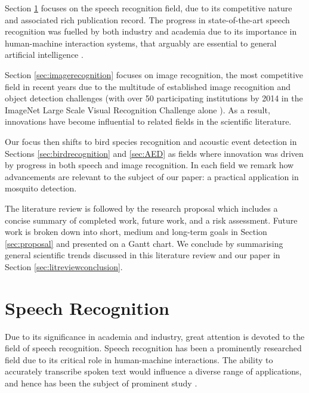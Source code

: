 \documentclass[12pt]{llncs}
\begin{document}
Section \ref{sec:speechrecognition} focuses on the speech recognition field, due to its competitive nature and associated rich publication record. The progress in state-of-the-art speech recognition was fuelled by both industry and academia due to its importance in human-machine interaction systems, that arguably are essential to general artificial intelligence \cite{rabiner1993fundamentals,juang2005automatic}. 

Section \ref{sec:imagerecognition} focuses on image recognition, the most competitive field in recent years due to the multitude of established image recognition and object detection challenges (with over 50 participating institutions by 2014 in the ImageNet Large Scale Visual Recognition Challenge alone \cite{russakovsky2014imagenet}). As a result, innovations have become influential to related fields in the scientific literature.

Our focus then shifts to bird species recognition and acoustic event detection in Sections \ref{sec:birdrecognition} and \ref{sec:AED} as fields where innovation was driven by progress in both speech and image recognition. In each field we remark how advancements are relevant to the subject of our paper: a practical application in mosquito detection.

The literature review is followed by the research proposal which includes a concise summary of completed work, future work, and a risk assessment. Future work is broken down into short, medium and long-term goals in Section \ref{sec:proposal} and presented on a Gantt chart. We conclude by summarising general scientific trends discussed in this literature review and our paper in Section \ref{sec:litreviewconclusion}.



\section{Speech Recognition}
\label{sec:speechrecognition}
Due to its significance in academia and industry, great attention is devoted to the field of speech recognition. Speech recognition has been a prominently researched field due to its critical role in human-machine interactions. The ability to accurately transcribe spoken text would influence a diverse range of applications, and hence has been the subject of prominent study \cite{juang2005automatic}. 
\end{document}

